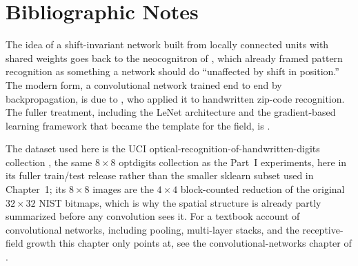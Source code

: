 
\section*{Bibliographic Notes}

The idea of a shift-invariant network built from locally connected units with
shared weights goes back to the neocognitron of \textcite{fukushima1980}, which
already framed pattern recognition as something a network should do
``unaffected by shift in position.'' The modern form, a convolutional network
trained end to end by backpropagation, is due to \textcite{lecun1989}, who
applied it to handwritten zip-code recognition. The fuller treatment, including
the LeNet architecture and the gradient-based learning framework that became
the template for the field, is \textcite{lecun1998}.

The dataset used here is the UCI optical-recognition-of-handwritten-digits
collection \parencite{uci1998digits}, the same $8 \times 8$ optdigits collection as
the Part~I experiments, here in its fuller train/test release rather than the
smaller sklearn subset used in Chapter~1; its $8 \times 8$ images are the $4 \times 4$
block-counted reduction of the original $32 \times 32$ NIST bitmaps, which is
why the spatial structure is already partly summarized before any convolution
sees it. For a textbook account of convolutional networks, including pooling,
multi-layer stacks, and the receptive-field growth this chapter only points
at, see the convolutional-networks chapter of
\textcite{goodfellow2016dlbook}.
